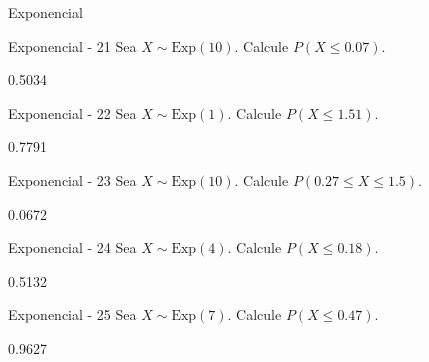 \documentclass[a4,11pt]{aleph-notas}
\newcommand{\Exp}{\text{Exp}}
\begin{document}
\begin{quiz}{Exponencial}
\begin{numerical}[tolerance=0.001]%
    {Exponencial - 21}
    Sea \( X \sim \Exp(10) \). Calcule \( P(X \leq 0.07) \).
    \item[] 0.5034
\end{numerical}

\begin{numerical}[tolerance=0.001]%
    {Exponencial - 22}
    Sea \( X \sim \Exp(1) \). Calcule \( P(X \leq 1.51) \).
    \item[] 0.7791
\end{numerical}

\begin{numerical}[tolerance=0.001]%
    {Exponencial - 23}
    Sea \( X \sim \Exp(10) \). Calcule \( P(0.27 \leq X \leq 1.5) \).
    \item[] 0.0672
\end{numerical}

\begin{numerical}[tolerance=0.001]%
    {Exponencial - 24}
    Sea \( X \sim \Exp(4) \). Calcule \( P(X \leq 0.18) \).
    \item[] 0.5132
\end{numerical}

\begin{numerical}[tolerance=0.001]%
    {Exponencial - 25}
    Sea \( X \sim \Exp(7) \). Calcule \( P(X \leq 0.47) \).
    \item[] 0.9627
\end{numerical}




\end{quiz}
\end{document}
